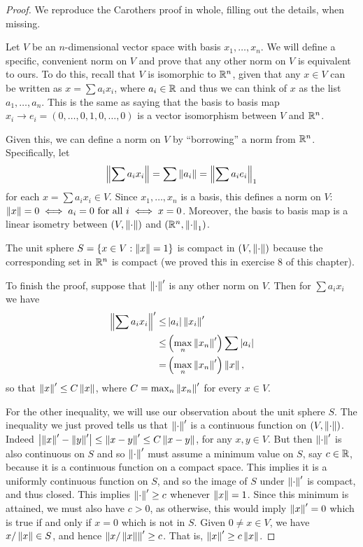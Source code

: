 \begin{proof}
We reproduce the Carothers proof in whole, filling out the details, when missing.

Let $V$ be an $n$-dimensional vector space with basis $x_1,\dots,x_n$.
We will define a specific, convenient norm on $V$ and prove that any other norm on $V$ is equivalent to ours.
To do this, recall that $V$ is isomorphic to $\mathbb{R}^n$, given that any $x\in V$ can be written as $x=\sum a_i x_i$, where $a_i\in\mathbb{R}$ and thus we can think of $x$ as the list $a_1,\dots,a_n$.
This is the same as saying that the basis to basis map $x_i\to e_i=(0,\dots,0,1,0,\dots,0)$ is a vector isomorphism between $V$ and $\mathbb{R}^n$.

Given this, we can define a norm on $V$ by ``borrowing'' a norm from $\mathbb{R}^n$.
Specifically, let
\begin{align*}
    \left\lVert \sum a_ix_i\right\rVert = \sum \left\lVert a_i\right\rVert = \left\lVert \sum a_i e_i\right\rVert_1
\end{align*}
for each $x=\sum a_i x_i \in V$.
Since $x_1,\dots,x_n$ is a basis, this defines a norm on $V$: $\left\lVert x\right\rVert=0 \iff a_i=0 \text{ for all } i \iff x=0$.
Moreover, the basis to basis map is a linear isometry between $(V, \left\lVert \cdot\right\rVert)$ and $(\mathbb{R}^n, \left\lVert \cdot\right\rVert_1)$.

The unit sphere $S=\{x\in V:\left\lVert x\right\rVert=1\}$ is compact in $(V,\left\lVert \cdot\right\rVert)$ because the corresponding set in $\mathbb{R}^n$ is compact (we proved this in exercise 8 of this chapter).

To finish the proof, suppose that $\left\lVert \cdot\right\rVert'$ is any other norm on $V$.
Then for $\sum a_ix_i$ we have 
\begin{align*}
    \left\lVert \sum a_ix_i\right\rVert'
    \leq& \left\lvert a_i\right\rvert\left\lVert x_i\right\rVert'\\
    \leq& \left( \max_n \left\lVert x_n\right\rVert'\right)\sum \left\lvert a_i\right\rvert\\
    =& \left( \max_n \left\lVert x_n\right\rVert'\right)\left\lVert x\right\rVert,
\end{align*}
so that $\left\lVert x\right\rVert' \leq C\left\lVert x\right\rVert$, where $C=\max_n \left\lVert x_n\right\rVert'$ for every $x\in V$.

For the other inequality, we will use our observation about the unit sphere $S$.
The inequality we just proved tells us that $\left\lVert \cdot\right\rVert'$ is a continuous function on $(V,\left\lVert \cdot\right\rVert)$.
Indeed $\left\lvert \left\lVert x\right\rVert'-\left\lVert y\right\rVert'\right\rvert \leq \left\lVert x-y\right\rVert' \leq C\left\lVert x-y\right\rVert$, for any $x,y\in V$.
But then $\left\lVert \cdot\right\rVert'$ is also continuous on $S$ and so $\left\lVert \cdot\right\rVert'$ must assume a minimum value on $S$, say $c\in\mathbb{R}$, because it is a continuous function on a compact space.
This implies it is a uniformly continuous function on $S$, and so the image of $S$ under $\left\lVert \cdot\right\rVert'$ is compact, and thus closed.
This implies $\left\lVert \cdot\right\rVert' \geq c$ whenever $\left\lVert x\right\rVert=1$.
Since this minimum is attained, we must also have $c>0$, as otherwise, this would imply $\left\lVert x\right\rVert'=0$ which is true if and only if $x=0$ which is not in $S$.
Given $0\neq x\in V$, we have $x/\left\lVert x\right\rVert\in S$, and hence $\left\lVert x/\left\lVert x\right\rVert\right\rVert'\geq c$.
That is, $\left\lVert x\right\rVert' \geq c\left\lVert x\right\rVert$.
\end{proof} 

